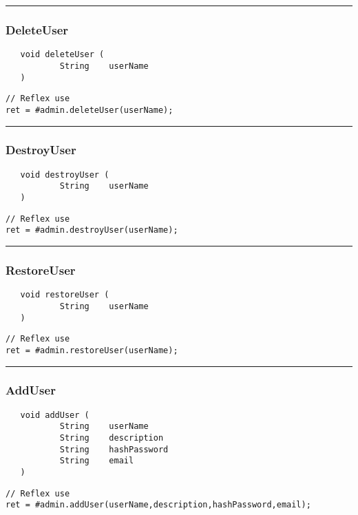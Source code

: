 \rule{15cm}{2pt}
\subsubsection{DeleteUser}
\label{Api:DeleteUser}
\begin{verbatim}
   void deleteUser (
           String    userName
   )
\end{verbatim}
\begin{lstlisting}[language=reflex]
// Reflex use
ret = #admin.deleteUser(userName);
\end{lstlisting}



\rule{15cm}{2pt}
\subsubsection{DestroyUser}
\label{Api:DestroyUser}
\begin{verbatim}
   void destroyUser (
           String    userName
   )
\end{verbatim}
\begin{lstlisting}[language=reflex]
// Reflex use
ret = #admin.destroyUser(userName);
\end{lstlisting}



\rule{15cm}{2pt}
\subsubsection{RestoreUser}
\label{Api:RestoreUser}
\begin{verbatim}
   void restoreUser (
           String    userName
   )
\end{verbatim}
\begin{lstlisting}[language=reflex]
// Reflex use
ret = #admin.restoreUser(userName);
\end{lstlisting}



\rule{15cm}{2pt}
\subsubsection{AddUser}
\label{Api:AddUser}
\begin{verbatim}
   void addUser (
           String    userName
           String    description
           String    hashPassword
           String    email
   )
\end{verbatim}
\begin{lstlisting}[language=reflex]
// Reflex use
ret = #admin.addUser(userName,description,hashPassword,email);
\end{lstlisting}



